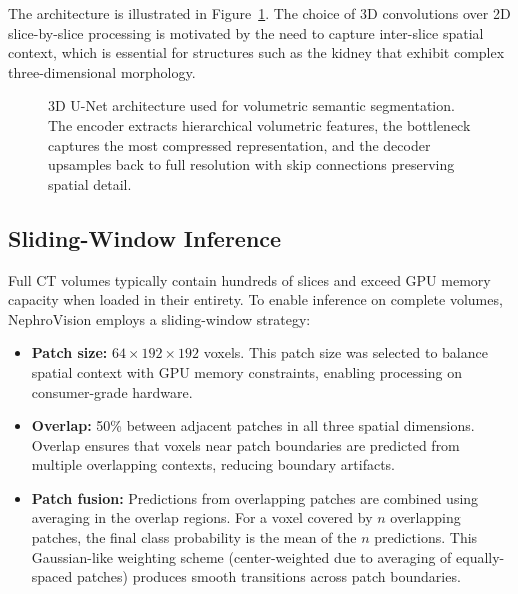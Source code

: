 The architecture is illustrated in Figure~\ref{fig:architecture}. The choice of 3D convolutions over 2D slice-by-slice processing is motivated by the need to capture inter-slice spatial context, which is essential for structures such as the kidney that exhibit complex three-dimensional morphology.

\begin{figure}[!t]
\centering
\caption{3D U-Net architecture used for volumetric semantic segmentation. The encoder extracts hierarchical volumetric features, the bottleneck captures the most compressed representation, and the decoder upsamples back to full resolution with skip connections preserving spatial detail.}
\label{fig:architecture}
\end{figure}

\subsection{Sliding-Window Inference}

Full CT volumes typically contain hundreds of slices and exceed GPU memory capacity when loaded in their entirety. To enable inference on complete volumes, NephroVision employs a sliding-window strategy:

\begin{itemize}
    \item \textbf{Patch size:} $64 \times 192 \times 192$ voxels. This patch size was selected to balance spatial context with GPU memory constraints, enabling processing on consumer-grade hardware.
    \item \textbf{Overlap:} 50\% between adjacent patches in all three spatial dimensions. Overlap ensures that voxels near patch boundaries are predicted from multiple overlapping contexts, reducing boundary artifacts.
    \item \textbf{Patch fusion:} Predictions from overlapping patches are combined using averaging in the overlap regions. For a voxel covered by $n$ overlapping patches, the final class probability is the mean of the $n$ predictions. This Gaussian-like weighting scheme (center-weighted due to averaging of equally-spaced patches) produces smooth transitions across patch boundaries.
\end{itemize}

